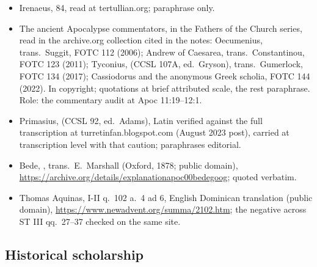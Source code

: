 \begin{itemize}
--- verified negative for , OCR-grade caveat; Bernard,
Assumption sermons, PL 183 --- the sole  Noah's (archive.org
items in the notes). Ambrose,  8.52 (PL
16), reported for the  figure, the column not
independently verified; Jerome's parallel ( XIII) likewise reported.
\item Irenaeus,  84,
read at tertullian.org; paraphrase only.
\item The ancient Apocalypse commentators, in the Fathers of the Church
series, read in the archive.org collection cited in the notes:
Oecumenius, trans.\ Suggit, FOTC 112 (2006); Andrew of Caesarea,
trans.\ Constantinou, FOTC 123 (2011); Tyconius,  (CCSL 107A, ed.\ Gryson), trans.\ Gumerlock, FOTC 134
(2017); Cassiodorus and the anonymous Greek scholia, FOTC 144 (2022).
In copyright; quotations at brief attributed scale, the rest
paraphrase. Role: the commentary audit at Apoc 11:19--12:1.
\item Primasius,  (CCSL 92, ed.\
Adams), Latin verified against the full transcription at
turretinfan.blogspot.com (August 2023 post), carried at transcription
level with that caution; paraphrases editorial.
\item Bede, , trans.\
E.~Marshall (Oxford, 1878; public domain),
\url{https://archive.org/details/explanationapoc00bedegoog}; quoted
verbatim.
\item Thomas Aquinas, \work{Summa theologiae} I-II q.~102 a.~4 ad 6,
English Dominican translation (public domain),
\url{https://www.newadvent.org/summa/2102.htm}; the negative across ST
III qq.~27--37 checked on the same site.
\end{itemize}

\subsection*{Historical scholarship}

